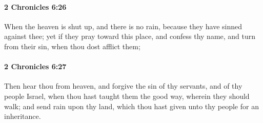 		\paragraph{2 Chronicles 6:26} %
			\label{2CHRONICLES-6-26}

			When the heaven is shut up, and there is no rain, because they have sinned against thee; yet if they pray toward this place, and confess thy name, and turn from their sin, when thou dost afflict them;


		\paragraph{2 Chronicles 6:27} %
			\label{2CHRONICLES-6-27}

			Then hear thou from heaven, and forgive the sin of thy servants, and of thy people Israel, when thou hast taught them the good way, wherein they should walk; and send rain upon thy land, which thou hast given unto thy people for an inheritance.

